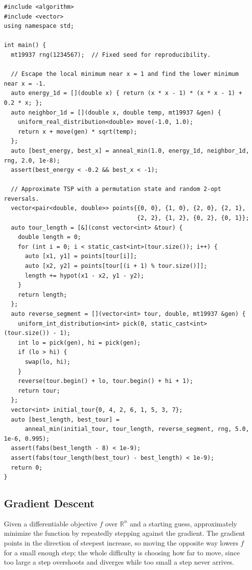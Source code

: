 \begin{lstlisting}[style=cpp]
#include <algorithm>
#include <vector>
using namespace std;

int main() {
  mt19937 rng(1234567);  // Fixed seed for reproducibility.

  // Escape the local minimum near x = 1 and find the lower minimum near x = -1.
  auto energy_1d = [](double x) { return (x * x - 1) * (x * x - 1) + 0.2 * x; };
  auto neighbor_1d = [](double x, double temp, mt19937 &gen) {
    uniform_real_distribution<double> move(-1.0, 1.0);
    return x + move(gen) * sqrt(temp);
  };
  auto [best_energy, best_x] = anneal_min(1.0, energy_1d, neighbor_1d, rng, 2.0, 1e-8);
  assert(best_energy < -0.2 && best_x < -1);

  // Approximate TSP with a permutation state and random 2-opt reversals.
  vector<pair<double, double>> points{{0, 0}, {1, 0}, {2, 0}, {2, 1},
                                      {2, 2}, {1, 2}, {0, 2}, {0, 1}};
  auto tour_length = [&](const vector<int> &tour) {
    double length = 0;
    for (int i = 0; i < static_cast<int>(tour.size()); i++) {
      auto [x1, y1] = points[tour[i]];
      auto [x2, y2] = points[tour[(i + 1) % tour.size()]];
      length += hypot(x1 - x2, y1 - y2);
    }
    return length;
  };
  auto reverse_segment = [](vector<int> tour, double, mt19937 &gen) {
    uniform_int_distribution<int> pick(0, static_cast<int>(tour.size()) - 1);
    int lo = pick(gen), hi = pick(gen);
    if (lo > hi) {
      swap(lo, hi);
    }
    reverse(tour.begin() + lo, tour.begin() + hi + 1);
    return tour;
  };
  vector<int> initial_tour{0, 4, 2, 6, 1, 5, 3, 7};
  auto [best_length, best_tour] =
      anneal_min(initial_tour, tour_length, reverse_segment, rng, 5.0, 1e-6, 0.995);
  assert(fabs(best_length - 8) < 1e-9);
  assert(fabs(tour_length(best_tour) - best_length) < 1e-9);
  return 0;
}
\end{lstlisting}
\subsection{Gradient Descent}
\label{sec:5.2.4}
Given a differentiable objective $f$ over $\mathbb{R}^n$ and a starting guess, approximately minimize the function by repeatedly stepping against the gradient. The gradient points in the direction of steepest increase, so moving the opposite way lowers $f$ for a small enough step; the whole difficulty is choosing how far to move, since too large a step overshoots and diverges while too small a step never arrives.

